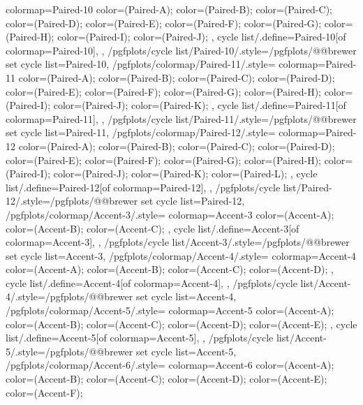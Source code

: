 {{    colormap={Paired-10}{
      color=(Paired-A);
      color=(Paired-B);
      color=(Paired-C);
      color=(Paired-D);
      color=(Paired-E);
      color=(Paired-F);
      color=(Paired-G);
      color=(Paired-H);
      color=(Paired-I);
      color=(Paired-J);
    },
    cycle list/.define={Paired-10}{[of colormap=Paired-10]},
  },
  /pgfplots/cycle list/Paired-10/.style={/pgfplots/@@brewer set cycle list={Paired-10}},
  /pgfplots/colormap/Paired-11/.style={
    colormap={Paired-11}{
      color=(Paired-A);
      color=(Paired-B);
      color=(Paired-C);
      color=(Paired-D);
      color=(Paired-E);
      color=(Paired-F);
      color=(Paired-G);
      color=(Paired-H);
      color=(Paired-I);
      color=(Paired-J);
      color=(Paired-K);
    },
    cycle list/.define={Paired-11}{[of colormap=Paired-11]},
  },
  /pgfplots/cycle list/Paired-11/.style={/pgfplots/@@brewer set cycle list={Paired-11}},
  /pgfplots/colormap/Paired-12/.style={
    colormap={Paired-12}{
      color=(Paired-A);
      color=(Paired-B);
      color=(Paired-C);
      color=(Paired-D);
      color=(Paired-E);
      color=(Paired-F);
      color=(Paired-G);
      color=(Paired-H);
      color=(Paired-I);
      color=(Paired-J);
      color=(Paired-K);
      color=(Paired-L);
    },
    cycle list/.define={Paired-12}{[of colormap=Paired-12]},
  },
  /pgfplots/cycle list/Paired-12/.style={/pgfplots/@@brewer set cycle list={Paired-12}},
  /pgfplots/colormap/Accent-3/.style={
    colormap={Accent-3}{
      color=(Accent-A);
      color=(Accent-B);
      color=(Accent-C);
    },
    cycle list/.define={Accent-3}{[of colormap=Accent-3]},
  },
  /pgfplots/cycle list/Accent-3/.style={/pgfplots/@@brewer set cycle list={Accent-3}},
  /pgfplots/colormap/Accent-4/.style={
    colormap={Accent-4}{
      color=(Accent-A);
      color=(Accent-B);
      color=(Accent-C);
      color=(Accent-D);
    },
    cycle list/.define={Accent-4}{[of colormap=Accent-4]},
  },
  /pgfplots/cycle list/Accent-4/.style={/pgfplots/@@brewer set cycle list={Accent-4}},
  /pgfplots/colormap/Accent-5/.style={
    colormap={Accent-5}{
      color=(Accent-A);
      color=(Accent-B);
      color=(Accent-C);
      color=(Accent-D);
      color=(Accent-E);
    },
    cycle list/.define={Accent-5}{[of colormap=Accent-5]},
  },
  /pgfplots/cycle list/Accent-5/.style={/pgfplots/@@brewer set cycle list={Accent-5}},
  /pgfplots/colormap/Accent-6/.style={
    colormap={Accent-6}{
      color=(Accent-A);
      color=(Accent-B);
      color=(Accent-C);
      color=(Accent-D);
      color=(Accent-E);
      color=(Accent-F);
}}}
